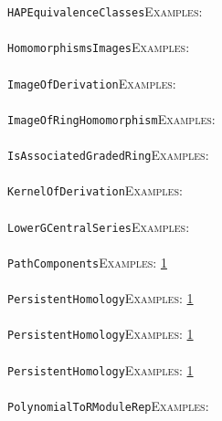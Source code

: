 \documentclass[a4paper,11pt]{report}
\begin{document}
{{ \texttt{HAP{\textunderscore}EquivalenceClasses}{\nobreakspace}{\nobreakspace}{\nobreakspace}{\nobreakspace}\textsc{Examples:} \\
 \\
 \texttt{HomomorphismsImages}{\nobreakspace}{\nobreakspace}{\nobreakspace}{\nobreakspace}\textsc{Examples:} \\
 \\
 \texttt{ImageOfDerivation}{\nobreakspace}{\nobreakspace}{\nobreakspace}{\nobreakspace}\textsc{Examples:} \\
 \\
 \texttt{ImageOfRingHomomorphism}{\nobreakspace}{\nobreakspace}{\nobreakspace}{\nobreakspace}\textsc{Examples:} \\
 \\
 \texttt{IsAssociatedGradedRing}{\nobreakspace}{\nobreakspace}{\nobreakspace}{\nobreakspace}\textsc{Examples:} \\
 \\
 \texttt{KernelOfDerivation}{\nobreakspace}{\nobreakspace}{\nobreakspace}{\nobreakspace}\textsc{Examples:} \\
 \\
 \texttt{LowerGCentralSeries}{\nobreakspace}{\nobreakspace}{\nobreakspace}{\nobreakspace}\textsc{Examples:} \\
 \\
 \texttt{PathComponents}{\nobreakspace}{\nobreakspace}{\nobreakspace}{\nobreakspace}\textsc{Examples:} \href{../www/SideLinks/About/aboutQuandles.html} {1}{\nobreakspace} \\
 \\
 \texttt{PersistentHomology}{\nobreakspace}{\nobreakspace}{\nobreakspace}{\nobreakspace}\textsc{Examples:} \href{../www/SideLinks/About/aboutPersistent.html} {1}{\nobreakspace} \\
 \\
 \texttt{PersistentHomology}{\nobreakspace}{\nobreakspace}{\nobreakspace}{\nobreakspace}\textsc{Examples:} \href{../www/SideLinks/About/aboutPersistent.html} {1}{\nobreakspace} \\
 \\
 \texttt{PersistentHomology}{\nobreakspace}{\nobreakspace}{\nobreakspace}{\nobreakspace}\textsc{Examples:} \href{../www/SideLinks/About/aboutPersistent.html} {1}{\nobreakspace} \\
 \\
 \texttt{PolynomialToRModuleRep}{\nobreakspace}{\nobreakspace}{\nobreakspace}{\nobreakspace}\textsc{Examples:} \\
 \\
}}
\end{document}
